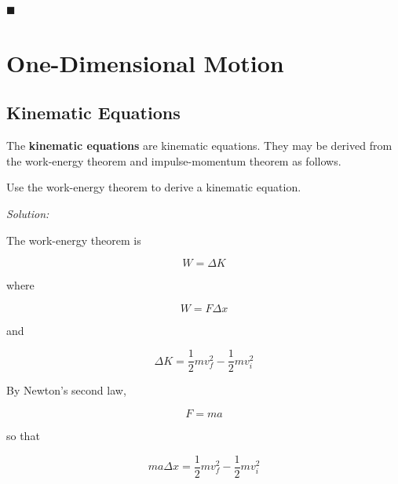 \documentclass[dvipsnames]{article}
\newif\ifShowUnitVI
\begin{document}
\hfill $\blacksquare$

\fi

\clearpage


\section{One-Dimensional Motion}

\ifShowUnitVI



\subsection{Kinematic Equations}

The \textbf{\gls{kinematic equations}} are \glsdesc{kinematic equations}. They may be derived from the work-energy theorem and impulse-momentum theorem as follows.

\begin{example}
    Use the work-energy theorem to derive a kinematic equation.
\end{example}

\textit{Solution:}

The work-energy theorem is

\begin{equation*}
    W = \Delta K
\end{equation*}

where

\begin{equation*}
    W = F \Delta x
\end{equation*}

and

\begin{equation*}
    \Delta K = \frac{1}{2}m v_f^2 - \frac{1}{2} m v_i^2
\end{equation*}

By Newton's second law,

\begin{equation*}
    F = ma
\end{equation*}

so that

\begin{equation*}
    ma \Delta x = \frac{1}{2}m v_f^2 - \frac{1}{2} m v_i^2
\end{equation*}
\end{document}
